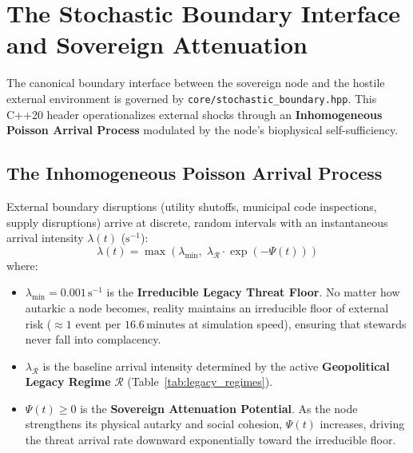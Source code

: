 \section{The Stochastic Boundary Interface and Sovereign Attenuation}
\label{sec:stochastic_boundary_interface}

The canonical boundary interface between the sovereign node and the hostile external environment is governed by \texttt{core/stochastic\_boundary.hpp}. This C++20 header operationalizes external shocks through an \textbf{Inhomogeneous Poisson Arrival Process} modulated by the node's biophysical self-sufficiency.

\subsection{The Inhomogeneous Poisson Arrival Process}
External boundary disruptions (utility shutoffs, municipal code inspections, supply disruptions) arrive at discrete, random intervals with an instantaneous arrival intensity $\lambda(t)$ ($\mathrm{s^{-1}}$):
\begin{equation}
\lambda(t) = \max\left( \lambda_{\min}, \; \lambda_{\mathcal{R}} \cdot \exp\left( -\Psi(t) \right) \right)
\label{eq:poisson_arrival_intensity}
\end{equation}
where:
\begin{itemize}
    \item $\lambda_{\min} = 0.001\,\mathrm{s^{-1}}$ is the \textbf{Irreducible Legacy Threat Floor}. No matter how autarkic a node becomes, reality maintains an irreducible floor of external risk ($\approx 1$ event per $16.6\,\mathrm{minutes}$ at simulation speed), ensuring that stewards never fall into complacency.
    \item $\lambda_{\mathcal{R}}$ is the baseline arrival intensity determined by the active \textbf{Geopolitical Legacy Regime} $\mathcal{R}$ (Table~\ref{tab:legacy_regimes}).
    \item $\Psi(t) \ge 0$ is the \textbf{Sovereign Attenuation Potential}. As the node strengthens its physical autarky and social cohesion, $\Psi(t)$ increases, driving the threat arrival rate downward exponentially toward the irreducible floor.
\end{itemize}

